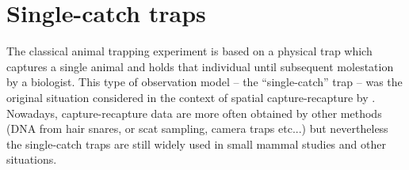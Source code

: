 \section{Single-catch traps}
\label{poisson-mn.sec.singlecatch}

The classical animal trapping experiment is based on a physical trap
which captures a single animal and holds that individual until
subsequent molestation by a biologist.
This type of observation model -- the ``single-catch'' trap --
was the original situation considered in the context of spatial
capture-recapture  by
\citet{efford:2004}. Nowadays, capture-recapture data are more often
obtained by other methods (DNA from hair snares, or scat sampling,
camera traps etc...) but nevertheless the single-catch traps are still
widely used in small mammal studies \citep{converse_etal:2006ea,
  converse_royle:2012} and other situations.


